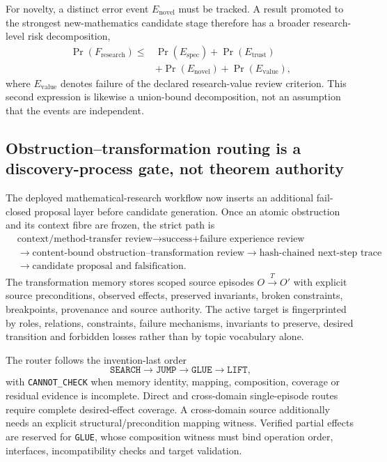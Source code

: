 For novelty, a distinct error event $E_{\mathrm{novel}}$ must be tracked. A result promoted to the strongest new-mathematics candidate stage therefore has a broader research-level risk decomposition,
\[
\begin{aligned}
\Pr(F_{\mathrm{research}})\leq{}&\Pr(E_{\mathrm{spec}})
+\Pr(E_{\mathrm{trust}})\\
&+\Pr(E_{\mathrm{novel}})
+\Pr(E_{\mathrm{value}}),
\end{aligned}
\]
where $E_{\mathrm{value}}$ denotes failure of the declared research-value review criterion. This second expression is likewise a union-bound decomposition, not an assumption that the events are independent.

\subsection{Obstruction--transformation routing is a discovery-process gate, not theorem authority}

The deployed mathematical-research workflow now inserts an additional fail-closed proposal layer before candidate generation. Once an atomic obstruction and its context fibre are frozen, the strict path is
\[
\begin{aligned}
&\text{context/method-transfer review}
\rightarrow \text{success+failure experience review}\\
&\rightarrow \text{content-bound obstruction--transformation review}
\rightarrow \text{hash-chained next-step trace}\\
&\rightarrow \text{candidate proposal and falsification}.
\end{aligned}
\]
The transformation memory stores scoped source episodes $O\xrightarrow{T}O'$ with explicit source preconditions, observed effects, preserved invariants, broken constraints, breakpoints, provenance and source authority. The active target is fingerprinted by roles, relations, constraints, failure mechanisms, invariants to preserve, desired transition and forbidden losses rather than by topic vocabulary alone.

The router follows the invention-last order
\[
\texttt{SEARCH}\rightarrow\texttt{JUMP}\rightarrow\texttt{GLUE}\rightarrow\texttt{LIFT},
\]
with \texttt{CANNOT\_CHECK} when memory identity, mapping, composition, coverage or residual evidence is incomplete. Direct and cross-domain single-episode routes require complete desired-effect coverage. A cross-domain source additionally needs an explicit structural/precondition mapping witness. Verified partial effects are reserved for \texttt{GLUE}, whose composition witness must bind operation order, interfaces, incompatibility checks and target validation.

